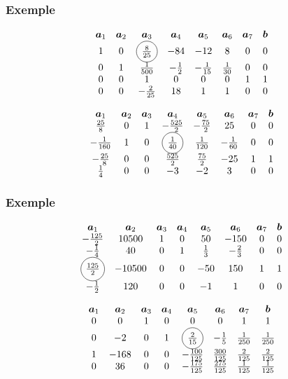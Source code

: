 \documentclass[t,usepdftitle=false]{beamer}
\newcommand*\circled[1]{\tikz[baseline=(char.base)]{
    \node[shape=circle,draw,inner sep=2pt] (char) {#1};}}
\def\ba{\boldsymbol{a}}
\def\bb{\boldsymbol{b}}
\begin{document}
\begin{frame}
	\frametitle{Exemple}
	
	\[
	\begin{matrix}
		\ba_1 & \ba_2 & \ba_3 & \ba_4 & \ba_5 &\ba_6 &\ba_7 & \bb \\
		1 & 0 & \circled{$\frac{8}{25}$} & -84 & -12 & 8 & 0 & 0 \\
		0 & 1 & \frac{1}{500} & -\frac{1}{2} & -\frac{1}{15} & \frac{1}{30} & 0 & 0 \\
		0 & 0 & 1 & 0 & 0 & 0 & 1 & 1 \\
		0 & 0 & -\frac{2}{25} & 18 & 1 & 1 & 0 & 0
	\end{matrix}
	\]
	
	\[
	\begin{matrix}
		\ba_1 & \ba_2 & \ba_3 & \ba_4 & \ba_5 &\ba_6 &\ba_7 & \bb \\
		\frac{25}{8} & 0 & 1 & -\frac{525}{2} & -\frac{75}{2} & 25 & 0 & 0 \\
		-\frac{1}{160} & 1 & 0 & \circled{$\frac{1}{40}$} & \frac{1}{120} & -\frac{1}{60} & 0 & 0 \\
		-\frac{25}{8} & 0 & 0 & \frac{525}{2} & \frac{75}{2} & -25 & 1 & 1 \\
		\frac{1}{4} & 0 & 0 & -3 & -2 & 3 & 0 & 0
	\end{matrix}
	\]
	
\end{frame}

\begin{frame}
	\frametitle{Exemple}
	
	\[
	\begin{matrix}
		\ba_1 & \ba_2 & \ba_3 & \ba_4 & \ba_5 &\ba_6 &\ba_7 & \bb \\
		-\frac{125}{2} & 10500 & 1 & 0 & 50 & -150 & 0 & 0 \\
		-\frac{1}{4} & 40 & 0 & 1 & \frac{1}{3} & -\frac{2}{3} & 0 & 0 \\
		\circled{$\frac{125}{2}$} & -10500 & 0 & 0 & -50 & 150 & 1 & 1 \\
		-\frac{1}{2} & 120 & 0 & 0 & -1 & 1 & 0 & 0
	\end{matrix}
	\]
	
	\[
	\begin{matrix}
		\ba_1 & \ba_2 & \ba_3 & \ba_4 & \ba_5 &\ba_6 &\ba_7 & \bb \\
		0 & 0 & 1 & 0 & 0 & 0 & 1 & 1 \\
		0 & -2 & 0 & 1 & \circled{$\frac{2}{15}$} & -\frac{1}{5} & \frac{1}{250} & \frac{1}{250} \\
		1 & -168 & 0 & 0 & -\frac{100}{125} & \frac{300}{125} & \frac{2}{125} & \frac{2}{125} \\
		0 & 36 & 0 & 0 & -\frac{175}{125} & \frac{275}{125} & \frac{1}{125} & \frac{1}{125}
	\end{matrix}
	\]
	
\end{frame}
\end{document}

